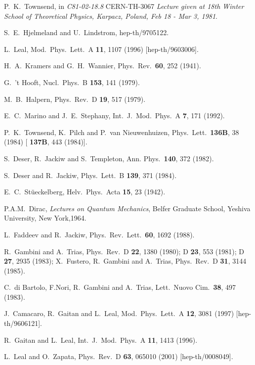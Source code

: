 \documentclass[a4paper,12pt]{article}
\begin{document}
\begin{thebibliography}{25}
P.~K.~Townsend,
in {\it C81-02-18.8}
CERN-TH-3067
{\it Lecture given at 18th Winter School of Theoretical Physics, Karpacz, Poland, Feb 18 - Mar 3, 1981}.

 S.~E.~Hjelmeland and U.~Lindstrom,
hep-th/9705122.

 L.~Leal,
Mod.\ Phys.\ Lett.\ A {\bf 11}, 1107 (1996)
[hep-th/9603006].

H.~A.~Kramers and G.~H.~Wannier,
Phys.\ Rev.\  {\bf 60}, 252 (1941).

 G.~'t Hooft,
Nucl.\ Phys.\ B {\bf 153}, 141 (1979).

M.~B.~Halpern,
Phys.\ Rev.\ D {\bf 19}, 517 (1979).

E.~C.~Marino and J.~E.~Stephany,
Int.\ J.\ Mod.\ Phys.\ A {\bf 7}, 171 (1992).

 P.~K.~Townsend, K.~Pilch and P.~van Nieuwenhuizen,
Phys.\ Lett.\  {\bf 136B}, 38 (1984)
[ {\bf 137B}, 443 (1984)].

 S.~Deser, R.~Jackiw and S.~Templeton,
Ann. Phys.\  {\bf 140}, 372 (1982).

 S.~Deser and R.~Jackiw,
Phys.\ Lett.\ B {\bf 139}, 371 (1984).

E.~C.~St\"ueckelberg,
Helv.\ Phys.\ Acta {\bf 15}, 23 (1942).

P.A.M.~Dirac, {\it Lectures on Quantum Mechanics}, Belfer Graduate
School, Yeshiva University, New York,1964.

 L.~Faddeev and R.~Jackiw,
Phys.\ Rev.\ Lett.\  {\bf 60}, 1692 (1988).

 R.~Gambini and A.~Trias,
Phys.\ Rev.\ D {\bf 22}, 1380 (1980);
D {\bf 23}, 553 (1981);
D {\bf 27}, 2935 (1983);
X.~Fustero, R.~Gambini and A.~Trias,
Phys.\ Rev.\ D {\bf 31}, 3144 (1985).

 C.~di Bartolo, F.Nori, R.~Gambini and A.~Trias,
Lett.\ Nuovo Cim.\  {\bf 38}, 497 (1983).

 J.~Camacaro, R.~Gaitan and L.~Leal,
Mod.\ Phys.\ Lett.\ A {\bf 12}, 3081 (1997)
[hep-th/9606121].

 R.~Gaitan and L.~Leal,
Int.\ J.\ Mod.\ Phys.\ A {\bf 11}, 1413 (1996).


 L.~Leal and O.~Zapata,
Phys.\ Rev.\ D {\bf 63}, 065010 (2001)
[hep-th/0008049].



\end{thebibliography}
\end{document}
